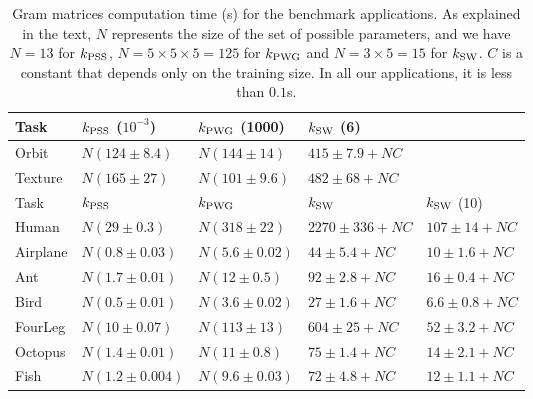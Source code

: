 \documentclass[11pt]{article}
\newcommand{\kPSS}{k_{\rm PSS}}
\newcommand{\kPWG}{k_{\rm PWG}}
\newcommand{\kSW}{k_{\rm SW}}
\begin{document}
\begin{table}[t]
\vskip 0.15in
\begin{center}
\begin{small}
\begin{sc}
\begin{tabular}{|l|llll|}
\hline 
Task &         $\kPSS$ ($10^{-3}$) &  $\kPWG$ (1000) &    $\kSW$ (6) &         \\
\hline 
Orbit &        $N(124\pm8.4)$ &       $N(144\pm14)$ &     $415\pm7.9+NC$ &                     \\        
Texture &      $N(165\pm27)$ &        $N(101\pm9.6)$ &    $482\pm68+NC$ &                      \\                                           
\hline 
Task &         $\kPSS$ &              $\kPWG$ &           $\kSW$ &           $\kSW$ (10) \\
\hline 
Human &        $N(29\pm0.3)$ &        $N(318\pm22)$ &     $2270\pm336+NC$ &  $107\pm14+NC$ \\
Airplane &     $N(0.8\pm0.03)$ &      $N(5.6\pm0.02)$ &   $44\pm5.4+NC$ &    $10\pm1.6+NC$ \\
Ant &          $N(1.7\pm0.01)$ &      $N(12\pm0.5)$ &     $92\pm2.8+NC$ &    $16\pm0.4+NC$ \\
Bird &         $N(0.5\pm0.01)$ &      $N(3.6\pm0.02)$ &   $27\pm1.6+NC$ &    $6.6\pm0.8+NC$ \\
FourLeg &      $N(10\pm0.07)$ &       $N(113\pm13)$ &     $604\pm25+NC$ &    $52\pm3.2+NC$ \\
Octopus &      $N(1.4\pm0.01)$ &      $N(11\pm0.8)$ &     $75\pm1.4+NC$ &    $14\pm2.1+NC$ \\
Fish &         $N(1.2\pm0.004)$ &     $N(9.6\pm0.03)$ &   $72\pm4.8+NC$ &    $12\pm1.1+NC$ \\
\hline                                                            
\end{tabular}

\end{sc}
\end{small}
\caption{\label{table:Gram} Gram matrices computation time (s) for the benchmark applications.
As explained in the text, $N$ represents the size of the set of possible parameters, and we have $N=13$ for $\kPSS$, 
$N=5\times5\times5=125$ for $\kPWG$ and $N=3\times5=15$ for $\kSW$. $C$ is a constant that depends only on the
training size. In all our applications, it is less than $0.1$s.}
\end{center}
\vskip -0.1in
\end{table}
\end{document}
